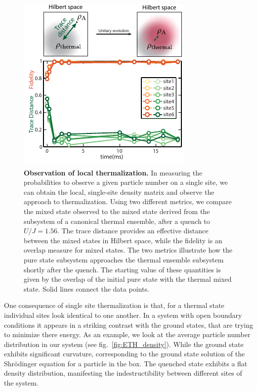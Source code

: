  \begin{figure}[t!]
	\centering
	\includegraphics[scale=1.5]{figures/ETH_fidelity.pdf}
	\caption{{\bf Observation of local thermalization.} In measuring the probabilities to observe a given particle number on a single site, we can obtain the local, single-site density matrix and observe the approach to thermalization. Using two different metrics, we compare the mixed state observed to the mixed state derived from the subsystem of a canonical thermal ensemble, after a quench to $U/J=1.56$. The trace distance provides an effective distance between the mixed states in Hilbert space, while the fidelity is an overlap measure for mixed states. The two metrics illustrate how the pure state subsystem approaches the thermal ensemble subsystem shortly after the quench. The starting value of these quantities is given by the overlap of the initial pure state with the thermal mixed state. Solid lines connect the data points.}
	\label{fig:ETH_Rho}
\end{figure} 

One consequence of single site thermalization is that, for a thermal state individual sites look identical to one another. In a system with open boundary conditions it appears in a striking contrast with the ground states, that are trying to minimize there energy. As an example, we look at the average particle number distribution in our system (see fig.~\ref{fig:ETH_density}). While the ground state exhibits significant curvature, corresponding to the ground state solution of the Shr\"odinger equation for a particle in the box. The quenched state exhibits a flat density distribution, manifesting the indestructibility between different sites of the system.

